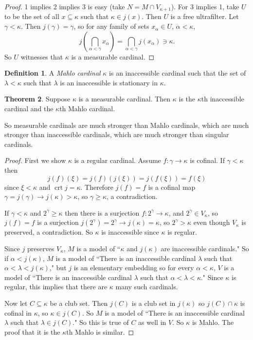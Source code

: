 \documentclass[12pt]{report}
\DeclareMathOperator{\crt}{crt}
\newcommand{\dfn}[1]{\emph{#1}\index{#1}}
\theoremstyle{definition}
\newtheorem{theorem}{Theorem}[chapter]
\newtheorem{definition}[theorem]{Definition}
\begin{document}
\begin{proof}
1 implies 2 implies 3 is easy (take $N = M \cap V_{\kappa + 1}$). For 3 implies 1, take $U$ to be the set of all $x \subseteq \kappa$ such that $\kappa \in j(x)$. Then $U$ is a free ultrafilter. Let $\gamma < \kappa$. Then $j(\gamma) = \gamma$, so for any family of sets $x_\alpha \in U$, $\alpha < \kappa$,
$$j\left(\bigcap_{\alpha < \gamma} x_\alpha\right) = \bigcap_{\alpha < \gamma} j(x_\alpha) \ni \kappa.$$
So $U$ witnesses that $\kappa$ is a measurable cardinal.
\end{proof}
\begin{definition}
    A \dfn{Mahlo cardinal} $\kappa$ is an inaccessible cardinal such that the set of $\lambda < \kappa$ such that $\lambda$ is an inaccessible is stationary in $\kappa$.
\end{definition}
\begin{theorem}
    Suppose $\kappa$ is a measurable cardinal. Then $\kappa$ is the $\kappa$th inaccessible cardinal and the $\kappa$th Mahlo cardinal.
\end{theorem}
    So measurable cardinals are much stronger than Mahlo cardinals, which are much stronger than inaccessible cardinals, which are much stronger than singular cardinals.
\begin{proof}
    First we show $\kappa$ is a regular cardinal. Assume $f: \gamma \to \kappa$ is cofinal. If $\gamma < \kappa$ then
    $$j(f)(\xi) = j(f)(j(\xi)) = j(f(\xi)) = f(\xi)$$
    since $\xi < \kappa$ and $\crt j = \kappa$. Therefore $j(f) = f$ is a cofinal map $\gamma = j(\gamma) \to j(\kappa) > \kappa$, so $\gamma \geq \kappa$, a contradiction.

    If $\gamma < \kappa$ and $2^\gamma \geq \kappa$ then there is a surjection $f: 2^\gamma \to \kappa$, and $2^\gamma \in V_\kappa$, so $j(f) = f$ is a surjection $j(2^\gamma) = 2^\gamma \to j(\kappa) = \kappa$, so $2^\gamma > \kappa$ even though $V_\kappa$ is preserved, a contradiction. So $\kappa$ is inaccessible since $\kappa$ is regular.

    Since $j$ preserves $V_\kappa$, $M$ is a model of ``$\kappa$ and $j(\kappa)$ are inaccessible cardinals." So if $\alpha < j(\kappa)$, $M$ is a model of ``There is an inaccessible cardinal $\lambda$ such that $\alpha < \lambda < j(\kappa)$," but $j$ is an elementary embedding so for every $\alpha < \kappa$, $V$ is a model of ``There is an inaccessible cardinal $\lambda$ such that $\alpha < \lambda < \kappa$." Since $\kappa$ is regular, this implies that there are $\kappa$ many such cardinals.

    Now let $C \subseteq \kappa$ be a club set. Then $j(C)$ is a club set in $j(\kappa)$ so $j(C) \cap \kappa$ is cofinal in $\kappa$, so $\kappa \in j(C)$. So $M$ is a model of ``There is an inaccessible cardinal $\lambda$ such that $\lambda \in j(C)$." So this is true of $C$ as well in $V$. So $\kappa$ is Mahlo. The proof that it is the $\kappa$th Mahlo is similar.
\end{proof}
\end{document}
